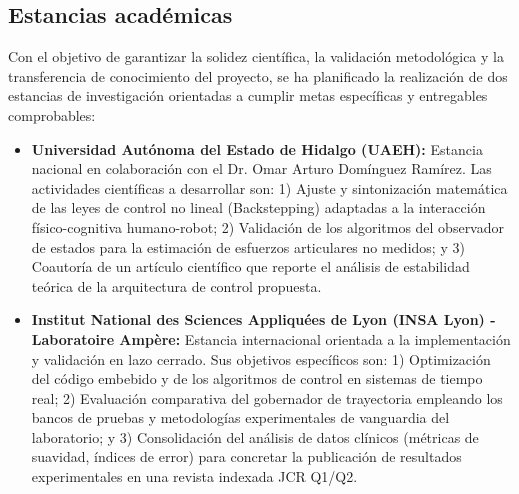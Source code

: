 \documentclass[a4paper,12pt]{article}
\begin{document}
\subsection{Estancias académicas}
Con el objetivo de garantizar la solidez científica, la validación metodológica y la transferencia de conocimiento del proyecto, se ha planificado la realización de dos estancias de investigación orientadas a cumplir metas específicas y entregables comprobables:
\begin{itemize}
    \item \textbf{Universidad Autónoma del Estado de Hidalgo (UAEH):} Estancia nacional en colaboración con el Dr. Omar Arturo Domínguez Ramírez. Las actividades científicas a desarrollar son: 1) Ajuste y sintonización matemática de las leyes de control no lineal (Backstepping) adaptadas a la interacción físico-cognitiva humano-robot; 2) Validación de los algoritmos del observador de estados para la estimación de esfuerzos articulares no medidos; y 3) Coautoría de un artículo científico que reporte el análisis de estabilidad teórica de la arquitectura de control propuesta.

    \item \textbf{Institut National des Sciences Appliquées de Lyon (INSA Lyon) - Laboratoire Ampère:} Estancia internacional orientada a la implementación y validación en lazo cerrado. Sus objetivos específicos son: 1) Optimización del código embebido y de los algoritmos de control en sistemas de tiempo real; 2) Evaluación comparativa del gobernador de trayectoria empleando los bancos de pruebas y metodologías experimentales de vanguardia del laboratorio; y 3) Consolidación del análisis de datos clínicos (métricas de suavidad, índices de error) para concretar la publicación de resultados experimentales en una revista indexada JCR Q1/Q2.
\end{itemize}
\end{document}

